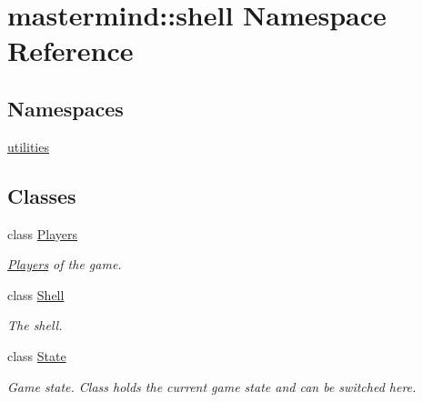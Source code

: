 \hypertarget{namespacemastermind_1_1shell}{}\section{mastermind\+:\+:shell Namespace Reference}
\label{namespacemastermind_1_1shell}
\subsection*{Namespaces}
\begin{DoxyCompactItemize}
\item 
 \hyperlink{namespacemastermind_1_1shell_1_1utilities}{utilities}
\end{DoxyCompactItemize}
\subsection*{Classes}
\begin{DoxyCompactItemize}
\item 
class \hyperlink{classmastermind_1_1shell_1_1_players}{Players}
\begin{DoxyCompactList}\small\item\em \hyperlink{classmastermind_1_1shell_1_1_players}{Players} of the game. \end{DoxyCompactList}\item 
class \hyperlink{classmastermind_1_1shell_1_1_shell}{Shell}
\begin{DoxyCompactList}\small\item\em The shell. \end{DoxyCompactList}\item 
class \hyperlink{classmastermind_1_1shell_1_1_state}{State}
\begin{DoxyCompactList}\small\item\em Game state. Class holds the current game state and can be switched here. \end{DoxyCompactList}\end{DoxyCompactItemize}
